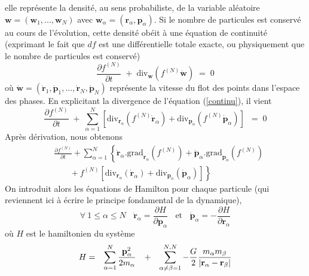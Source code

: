 elle repr\'{e}sente la densit\'{e}, au sens probabiliste, de la variable
al\'{e}atoire $\mathbf{w}=(\mathbf{w}_{1},...,\mathbf{w}_{N})$ avec
$\mathbf{w}_{\alpha}=\left(  \mathbf{r}_{\alpha},\mathbf{p}_{\alpha}\right)
$. Si le nombre de particules est conserv\'{e} au cours de l'\'{e}volution,
cette densit\'{e} ob\'{e}it \`{a} une \'{e}quation de continuit\'{e}
(exprimant le fait que $df$ est une diff\'{e}rentielle totale exacte, ou
physiquement que le nombre de particules est conserv\'{e})
\begin{equation}
\frac{\partial f^{(N)}}{\partial t}\;+\;\mathrm{div}_{\mathbf{w}}%
(f^{(N)}\mathbf{\dot{w}})\;=\;0\label{continu}%
\end{equation}
o\`{u} $\mathbf{\dot{w}}=(\mathbf{\dot{r}}_{1},\mathbf{\dot{p}}_{1}%
,...,\mathbf{\dot{r}}_{N},\mathbf{\dot{p}}_{N})$ repr\'{e}sente la vitesse du
flot des points dans l'espace des phases. En explicitant la divergence de
l'\'{e}quation (\ref{continu}), il vient
\[
\frac{\partial f^{(N)}}{\partial t}\;+\;\sum_{\alpha=1}^{N}\left[
\mathrm{div}_{\mathbf{r}_{\alpha}}\left(  f^{(N)}\mathbf{\dot{r}}_{\alpha
}\right)  +\mathrm{div}_{\mathbf{p}_{\alpha}}\left(  f^{(N)}\mathbf{\dot{p}%
}_{\alpha}\right)  \right]  ~\;=\;0
\]
Apr\`{e}s d\'{e}rivation, nous obtenons
\begin{align*}
&  \frac{\partial f^{(N)}}{\partial t}+\displaystyle\sum\limits_{\alpha=1}%
^{N}\left\{  \mathbf{\dot{r}}_{\alpha}.\mathrm{grad}_{\mathbf{r}_{\alpha}%
}\left(  f^{(N)}\right)  +\mathbf{\dot{p}}_{\alpha}.\mathrm{grad}%
_{\mathbf{p}_{\alpha}}\left(  f^{(N)}\right)  \right. \\
&  \,\;\;\;\;\;\;\;\left.  +~f^{(N)}\left[  \mathrm{div}_{\mathbf{r}_{\alpha}%
}\left(  \mathbf{\dot{r}}_{\alpha}\right)  +\mathrm{div}_{\mathbf{p}_{\alpha}%
}\left(  \mathbf{\dot{p}}_{\alpha}\right)  \right]  \right\}
\end{align*}
On introduit alors les \'{e}quations de {Hamilton} pour chaque particule (qui
reviennent ici \`{a} \'{e}crire le {principe} fondamental de la dynamique),
\[
\forall~1\leq\alpha\leq N~~~~\mathbf{\dot{r}}_{\alpha}=\frac{\partial
H}{\partial\mathbf{p}_{\alpha}}~~~~\text{et}~~~~\mathbf{\dot{p}}_{\alpha
}=-\frac{\partial H}{\partial\mathbf{r}_{\alpha}}
\]
o\`{u} $H$ est le hamiltonien du syst\`{e}me
\[%
\begin{array}
[c]{cccc}%
H= & \displaystyle\sum\limits_{\alpha=1}^{N}\dfrac{\mathbf{p}_{\alpha}^{2}%
}{2m_{\alpha}} & + & \displaystyle\sum\limits_{\alpha\neq\beta=1}^{N,N}%
-\dfrac{G}{2}\dfrac{m_{\alpha}m_{\beta}}{\left\vert \mathbf{r}_{\alpha
}-\mathbf{r}_{\beta}\right\vert }%
\end{array}
\]
